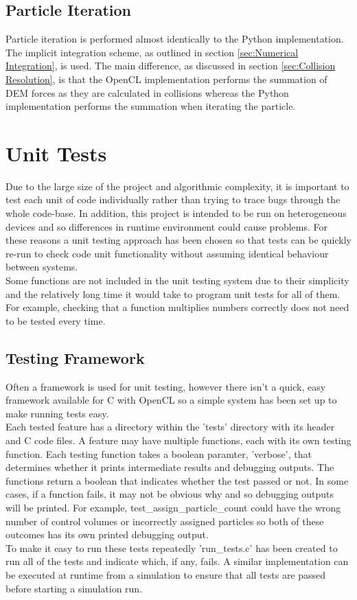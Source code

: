 \documentclass[10pt,a4paper,titlepage]{report}
\begin{document}
\subsection{Particle Iteration}
Particle iteration is performed almost identically to the Python implementation. The implicit integration scheme, as outlined in section \ref{sec:Numerical Integration}, is used. The main difference, as discussed in section \ref{sec:Collision Resolution}, is that the OpenCL implementation performs the summation of DEM forces as they are calculated in collisions whereas the Python implementation performs the summation when iterating the particle.
\section{Unit Tests}
Due to the large size of the project and algorithmic complexity, it is important to test each unit of code individually rather than trying to trace bugs through the whole code-base. In addition, this project is intended to be run on heterogeneous devices and so differences in runtime environment could cause problems. For these reasons a unit testing approach has been chosen so that tests can be quickly re-run to check code unit functionality without assuming identical behaviour between systems.
\\Some functions are not included in the unit testing system due to their simplicity and the relatively long time it would take to program unit tests for all of them. For example, checking that a function multiplies numbers correctly does not need to be tested every time.
\subsection{Testing Framework}
Often a framework is used for unit testing, however there isn't a quick, easy framework available for C with OpenCL so a simple system has been set up to make running tests easy.
\\Each tested feature has a directory within the 'tests' directory with its header and C code files. A feature may have multiple functions, each with its own testing function. Each testing function takes a boolean paramter, 'verbose', that determines whether it prints intermediate results and debugging outputs. The functions return a boolean that indicates whether the test passed or not. In some cases, if a function fails, it may not be obvious why and so debugging outputs will be printed. For example, test\_assign\_particle\_count could have the wrong number of control volumes or incorrectly assigned particles so both of these outcomes has its own printed debugging output. %
\\To make it easy to run these tests repeatedly 'run\_tests.c' has been created to run all of the tests and indicate which, if any, fails. A similar implementation can be executed at runtime from a simulation to ensure that all tests are passed before starting a simulation run.
\end{document}
